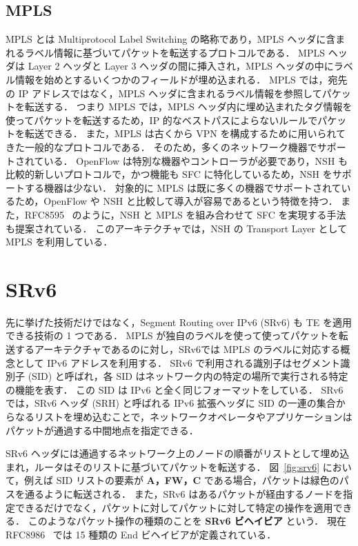 \subsection{MPLS}
\label{sbsection:mpls}
MPLS とは Multiprotocol Label Switching の略称であり，MPLS ヘッダに含まれるラベル情報に基づいてパケットを転送するプロトコルである．
MPLS ヘッダは Layer 2 ヘッダと Layer 3 ヘッダの間に挿入され，MPLS ヘッダの中にラベル情報を始めとするいくつかのフィールドが埋め込まれる．
MPLS では，宛先の IP アドレスではなく，MPLS ヘッダに含まれるラベル情報を参照してパケットを転送する．
つまり MPLS では，MPLS ヘッダ内に埋め込まれたタグ情報を使ってパケットを転送するため，IP 的なベストパスによらないルールでパケットを転送できる．
また，MPLS は古くから VPN を構成するために用いられてきた一般的なプロトコルである．
そのため，多くのネットワーク機器でサポートされている．
OpenFlow は特別な機器やコントローラが必要であり，NSH も比較的新しいプロトコルで，かつ機能も SFC に特化しているため，NSH をサポートする機器は少ない．
対象的に MPLS は既に多くの機器でサポートされているため，OpenFlow や NSH と比較して導入が容易であるという特徴を持つ．
また，RFC8595~\cite{rfc8595} のように，NSH と MPLS を組み合わせて SFC を実現する手法も提案されている．
このアーキテクチャでは，NSH の Transport Layer として MPLS を利用している．

\section{SRv6}
\label{section:srv6}
先に挙げた技術だけではなく，Segment Routing over IPv6 (SRv6) も TE を適用できる技術の 1 つである．
MPLS が独自のラベルを使って使ってパケットを転送するアーキテクチャであるのに対し，SRv6では MPLS のラベルに対応する概念として IPv6 アドレスを利用する．
SRv6 で利用される識別子はセグメント識別子 (SID) と呼ばれ，各 SID はネットワーク内の特定の場所で実行される特定の機能を表す．
この SID は IPv6 と全く同じフォーマットをしている．
SRv6 では，SRv6 ヘッダ (SRH) と呼ばれる IPv6 拡張ヘッダに SID の一連の集合からなるリストを埋め込むことで，ネットワークオペレータやアプリケーションはパケットが通過する中間地点を指定できる．

SRv6 ヘッダには通過するネットワーク上のノードの順番がリストとして埋め込まれ，ルータはそのリストに基づいてパケットを転送する．
図~\ref*{fig:srv6} において，例えば SID リストの要素が \textbf{A，FW，C} である場合，パケットは緑色のパスを通るように転送される．
また，SRv6 はあるパケットが経由するノードを指定できるだけでなく，パケットに対してパケットに対して特定の操作を適用できる．
このようなパケット操作の種類のことを \textbf{SRv6 ビヘイビア} という．
現在 RFC8986~\cite{rfc8986} では 15 種類の End ビヘイビアが定義されている．

